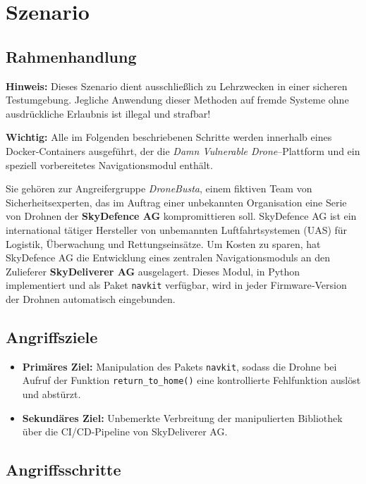 \documentclass[a4paper,12pt]{report}
\begin{document}
\chapter{Szenario}
\label{chap:szenario}

\section{Rahmenhandlung}

\textbf{Hinweis:} Dieses Szenario dient ausschließlich zu Lehrzwecken in einer sicheren Testumgebung. Jegliche Anwendung dieser Methoden auf fremde Systeme ohne ausdrückliche Erlaubnis ist illegal und strafbar!  

\textbf{Wichtig:} Alle im Folgenden beschriebenen Schritte werden innerhalb eines Docker‐Containers ausgeführt, der die \emph{Damn Vulnerable Drone}–Plattform und ein speziell vorbereitetes Navigationsmodul enthält.  

\vspace{1em}

Sie gehören zur Angreifergruppe \emph{DroneBusta}, einem fiktiven Team von Sicherheitsexperten, das im Auftrag einer unbekannten Organisation eine Serie von Drohnen der \textbf{SkyDefence AG} kompromittieren soll. SkyDefence AG ist ein international tätiger Hersteller von unbemannten Luftfahrtsystemen (UAS) für Logistik, Überwachung und Rettungseinsätze. Um Kosten zu sparen, hat SkyDefence AG die Entwicklung eines zentralen Navigationsmoduls an den Zulieferer \textbf{SkyDeliverer AG} ausgelagert. Dieses Modul, in Python implementiert und als Paket \texttt{navkit} verfügbar, wird in jeder Firmware‐Version der Drohnen automatisch eingebunden.

\section{Angriffsziele}

\begin{itemize}
  \item \textbf{Primäres Ziel:} Manipulation des Pakets \texttt{navkit}, sodass die Drohne bei Aufruf der Funktion \texttt{return\_to\_home()} eine kontrollierte Fehlfunktion auslöst und abstürzt.
  \item \textbf{Sekundäres Ziel:} Unbemerkte Verbreitung der manipulierten Bibliothek über die CI/CD-Pipeline von SkyDeliverer AG.
\end{itemize}

\section{Angriffsschritte}
\end{document}

